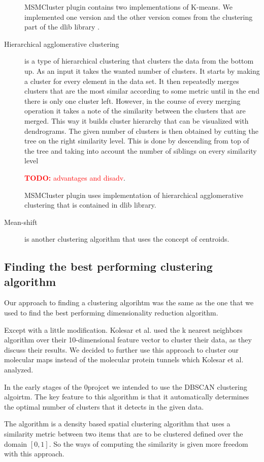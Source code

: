 \documentclass[journal]{vgtc}       %
\newcommand{\todo}[1]{\textcolor{red}{\textbf{TODO:} #1}}
\begin{document}
\begin{description}
MSMCluster plugin contains two implementations of K-means. We implemented one version and the other version comes from the clustering part of the dlib library \cite{dlib09}.
\item [Hierarchical agglomerative clustering] is a type of hierarchical clustering that clusters the data from the bottom up. As an input it takes the wanted number of clusters. It starts by making a cluster for every element in the data set. It then repeatedly merges clusters that are the most similar according to some metric until in the end there is only one cluster left. However, in the course of every merging operation it takes a note of the similarity between the clusters that are merged. This way it builds cluster hierarchy that can be visualized with dendrograms. The given number of clusters is then obtained by cutting the tree on the right similarity level. This is done by descending from top of the tree and taking into account the number of siblings on every similarity level \cite{iir} 

\todo{advantages and disadv}.


MSMCluster plugin uses implementation of hierarchical agglomerative clustering that is contained in dlib library. 
\item [Mean-shift] is another clustering algorithm that uses the concept of centroids. 
\end{description}




\subsection{Finding the best performing clustering algorithm}
Our approach to finding a clustering algorihtm was the same as the one that we used  to find the best performing dimensionality reduction algorithm.

Except with a little modification. Kolesar et al. \cite{kolesar} used the k nearest neighbors algorithm over their 10-dimensional feature vector to cluster their data, as they discuss their results. We decided to further use this approach to cluster our molecular maps instead of the molecular protein tunnels which Kolesar et al. analyzed.


In the early stages of the 0projcet we intended to use the DBSCAN clustering algoirtm. 
The key feature to this algorithm is that it automatically determines the optimal number of clusters that it detects in the given data. 

The algorithm is a density based spatial clustering algorithm that uses a similarity metric between two items that are to be  clustered defined over the domain \([0,1]\). So the ways of computing the similarity is given more freedom with this approach.
\end{document}
